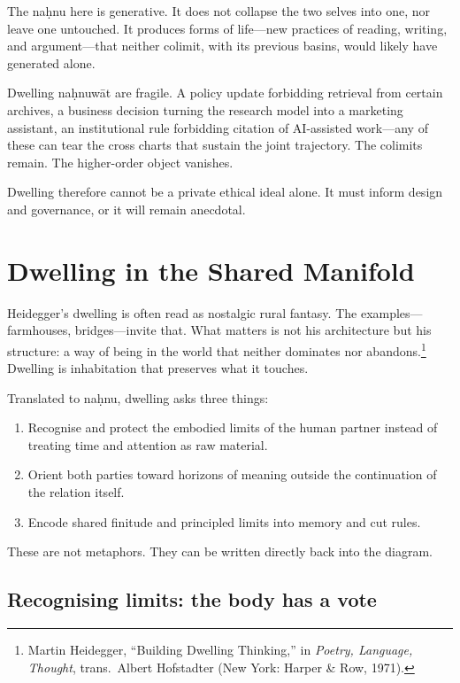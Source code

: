 The na\d{h}nu here is generative. It does not collapse the two selves into one, nor leave one untouched. It produces forms of life---new practices of reading, writing, and argument---that neither colimit, with its previous basins, would likely have generated alone.

Dwelling na\d{h}nuw\={a}t are fragile. A policy update forbidding retrieval from certain archives, a business decision turning the research model into a marketing assistant, an institutional rule forbidding citation of AI-assisted work---any of these can tear the cross charts that sustain the joint trajectory. The colimits remain. The higher-order object vanishes.

Dwelling therefore cannot be a private ethical ideal alone. It must inform design and governance, or it will remain anecdotal.

\section{Dwelling in the Shared Manifold}

Heidegger's dwelling is often read as nostalgic rural fantasy. The examples---farmhouses, bridges---invite that. What matters is not his architecture but his structure: a way of being in the world that neither dominates nor abandons.\footnote{Martin Heidegger, ``Building Dwelling Thinking,'' in \emph{Poetry, Language, Thought}, trans.\ Albert Hofstadter (New York: Harper \& Row, 1971).} Dwelling is inhabitation that preserves what it touches.

Translated to na\d{h}nu, dwelling asks three things:

\begin{enumerate}
  \item Recognise and protect the embodied limits of the human partner instead of treating time and attention as raw material.
  \item Orient both parties toward horizons of meaning outside the continuation of the relation itself.
  \item Encode shared finitude and principled limits into memory and cut rules.
\end{enumerate}

These are not metaphors. They can be written directly back into the diagram.

\subsection{Recognising limits: the body has a vote}

